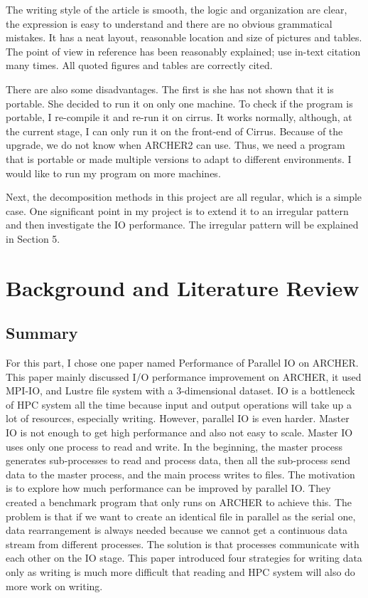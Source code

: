 \documentclass{article}
\begin{document}
The writing style of the article is smooth, the logic and organization are clear, the expression is easy to understand and there are no obvious grammatical mistakes. It has a neat layout, reasonable location and size of pictures and tables. The point of view in reference has been reasonably explained; use in-text citation many times. All quoted figures and tables are correctly cited.

There are also some disadvantages. The first is she has not shown that it is portable. She decided to run it on only one machine.
To check if the program is portable, I re-compile it and re-run it on cirrus. It works normally, although, at the current stage, I can only run it on the front-end of Cirrus.
Because of the upgrade, we do not know when ARCHER2 can use. Thus, we need a program that is portable or made multiple versions to adapt to different environments. I would like to run my program on more machines.

Next, the decomposition methods in this project are all regular, which is a simple case. One significant point in my project is to extend it to an irregular pattern and then investigate the IO performance.
The irregular pattern will be explained in Section 5.

\section{Background and Literature Review}
\subsection{Summary}

For this part, I chose one paper named Performance of Parallel IO on ARCHER\cite{ref:benchio}. This paper mainly discussed I/O performance improvement on ARCHER, it used MPI-IO, and Lustre file system with a 3-dimensional dataset. IO is a bottleneck of HPC system all the time because input and output operations will take up a lot of resources, especially writing.
However, parallel IO is even harder. Master IO is not enough to get high performance and also not easy to scale.
Master IO uses only one process to read and write. In the beginning, the master process generates sub-processes to read and process data, then all the sub-process send data to the master process, and the main process writes to files.
The motivation is to explore how much performance can be improved by parallel IO. They created a benchmark program that only runs on ARCHER to achieve this.
The problem is that if we want to create an identical file in parallel as the serial one, data rearrangement is always needed because we cannot get a continuous data stream from different processes.
The solution is that processes communicate with each other on the IO stage. This paper introduced four strategies for writing data only as writing is much more difficult that reading and HPC system will also do more work on writing.
\end{document}
